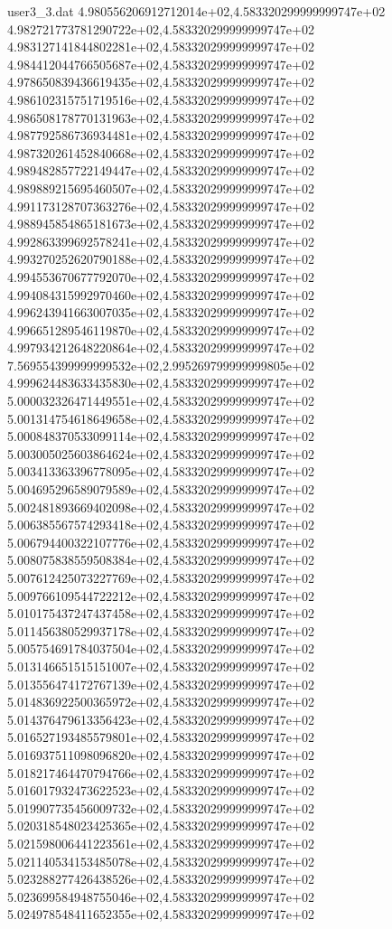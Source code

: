 \begin{filecontents}{user3_3.dat}
4.980556206912712014e+02,4.583320299999999747e+02
4.982721773781290722e+02,4.583320299999999747e+02
4.983127141844802281e+02,4.583320299999999747e+02
4.984412044766505687e+02,4.583320299999999747e+02
4.978650839436619435e+02,4.583320299999999747e+02
4.986102315751719516e+02,4.583320299999999747e+02
4.986508178770131963e+02,4.583320299999999747e+02
4.987792586736934481e+02,4.583320299999999747e+02
4.987320261452840668e+02,4.583320299999999747e+02
4.989482857722149447e+02,4.583320299999999747e+02
4.989889215695460507e+02,4.583320299999999747e+02
4.991173128707363276e+02,4.583320299999999747e+02
4.988945854865181673e+02,4.583320299999999747e+02
4.992863399692578241e+02,4.583320299999999747e+02
4.993270252620790188e+02,4.583320299999999747e+02
4.994553670677792070e+02,4.583320299999999747e+02
4.994084315992970460e+02,4.583320299999999747e+02
4.996243941663007035e+02,4.583320299999999747e+02
4.996651289546119870e+02,4.583320299999999747e+02
4.997934212648220864e+02,4.583320299999999747e+02
7.569554399999999532e+02,2.995269799999999805e+02
4.999624483633435830e+02,4.583320299999999747e+02
5.000032326471449551e+02,4.583320299999999747e+02
5.001314754618649658e+02,4.583320299999999747e+02
5.000848370533099114e+02,4.583320299999999747e+02
5.003005025603864624e+02,4.583320299999999747e+02
5.003413363396778095e+02,4.583320299999999747e+02
5.004695296589079589e+02,4.583320299999999747e+02
5.002481893669402098e+02,4.583320299999999747e+02
5.006385567574293418e+02,4.583320299999999747e+02
5.006794400322107776e+02,4.583320299999999747e+02
5.008075838559508384e+02,4.583320299999999747e+02
5.007612425073227769e+02,4.583320299999999747e+02
5.009766109544722212e+02,4.583320299999999747e+02
5.010175437247437458e+02,4.583320299999999747e+02
5.011456380529937178e+02,4.583320299999999747e+02
5.005754691784037504e+02,4.583320299999999747e+02
5.013146651515151007e+02,4.583320299999999747e+02
5.013556474172767139e+02,4.583320299999999747e+02
5.014836922500365972e+02,4.583320299999999747e+02
5.014376479613356423e+02,4.583320299999999747e+02
5.016527193485579801e+02,4.583320299999999747e+02
5.016937511098096820e+02,4.583320299999999747e+02
5.018217464470794766e+02,4.583320299999999747e+02
5.016017932473622523e+02,4.583320299999999747e+02
5.019907735456009732e+02,4.583320299999999747e+02
5.020318548023425365e+02,4.583320299999999747e+02
5.021598006441223561e+02,4.583320299999999747e+02
5.021140534153485078e+02,4.583320299999999747e+02
5.023288277426438526e+02,4.583320299999999747e+02
5.023699584948755046e+02,4.583320299999999747e+02
5.024978548411652355e+02,4.583320299999999747e+02

\end{filecontents}
